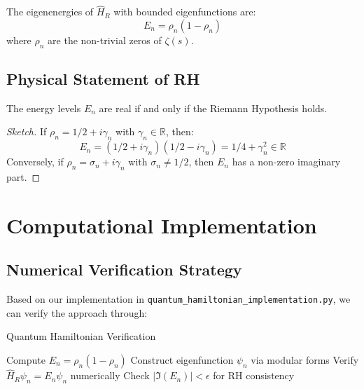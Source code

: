 \begin{theorem}
The eigenenergies of $\hat{H}_R$ with bounded eigenfunctions are:
\begin{equation}
E_n = \rho_n(1-\rho_n)
\end{equation}
where $\rho_n$ are the non-trivial zeros of $\zeta(s)$.
\end{theorem}

\subsection{Physical Statement of RH}

\begin{hypothesis}[Physical RH]
The energy levels $E_n$ are real if and only if the Riemann Hypothesis holds.
\end{hypothesis}

\begin{proof}[Sketch]
If $\rho_n = 1/2 + i\gamma_n$ with $\gamma_n \in \mathbb{R}$, then:
\begin{equation}
E_n = (1/2 + i\gamma_n)(1/2 - i\gamma_n) = 1/4 + \gamma_n^2 \in \mathbb{R}
\end{equation}
Conversely, if $\rho_n = \sigma_n + i\gamma_n$ with $\sigma_n \neq 1/2$, then $E_n$ has a non-zero imaginary part.
\end{proof}

\section{Computational Implementation}

\subsection{Numerical Verification Strategy}

Based on our implementation in \texttt{quantum\_hamiltonian\_implementation.py}, we can verify the approach through:

\begin{algorithm}
\caption{Quantum Hamiltonian Verification}
\begin{algorithmic}[1]
        \State Compute $E_n = \rho_n(1-\rho_n)$
        \State Construct eigenfunction $\psi_n$ via modular forms
        \State Verify $\hat{H}_R\psi_n = E_n\psi_n$ numerically
        \State Check $|\Im(E_n)| < \epsilon$ for RH consistency
    \EndFor
\EndProcedure
\end{algorithmic}
\end{algorithm}

